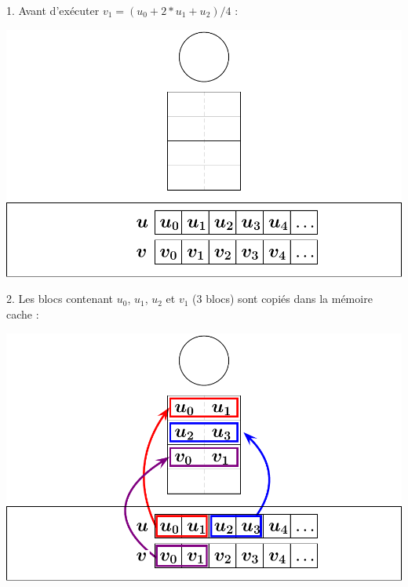 \documentclass{beamer}
\begin{document}
\begin{frame}
	\parbox[t][1cm]{10cm}{1. Avant d'exécuter $v_1 = (u_0 + 2*u_1 + u_2)/4$ :}
	\begin{center}
		\includegraphics[scale=0.6]{../../Images/sequentiel0}
	\end{center}
\end{frame}
\begin{frame}
	\parbox[t][1cm]{10cm}{2. Les blocs contenant $u_0$, $u_1$, $u_2$ et $v_1$ (3 blocs) sont copiés dans la mémoire cache :}
	\begin{center}
		\includegraphics[scale=0.6]{../../Images/sequentiel1}
	\end{center}
\end{frame}
\end{document}
